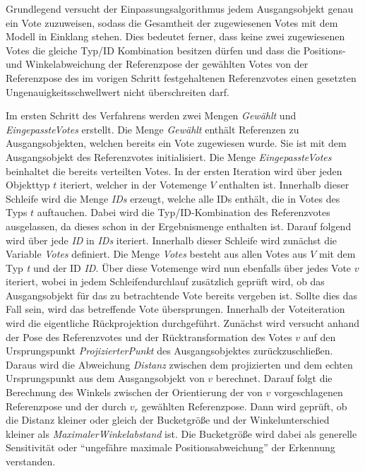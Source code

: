 Grundlegend versucht der Einpassungsalgorithmus jedem Ausgangsobjekt genau ein Vote zuzuweisen, sodass die Gesamtheit der zugewiesenen Votes mit dem Modell in Einklang stehen.
Dies bedeutet ferner, dass keine zwei zugewiesenen Votes die gleiche Typ/ID Kombination besitzen dürfen und dass die Positions- und Winkelabweichung der Referenzpose der gewählten Votes von der Referenzpose des im vorigen Schritt festgehaltenen Referenzvotes einen gesetzten Ungenauigkeitsschwellwert nicht überschreiten darf.

Im ersten Schritt des Verfahrens werden zwei Mengen \textit{Gewählt} und \textit{EingepassteVotes} erstellt.
Die Menge \textit{Gewählt} enthält Referenzen zu Ausgangsobjekten, welchen bereits ein Vote zugewiesen wurde. Sie ist mit dem Ausgangsobjekt des Referenzvotes initialisiert.
Die Menge \textit{EingepassteVotes} beinhaltet die bereits verteilten Votes.
In der ersten Iteration wird über jeden Objekttyp $t$ iteriert, welcher in der Votemenge $V$ enthalten ist.
Innerhalb dieser Schleife wird die Menge \textit{IDs} erzeugt, welche alle IDs enthält, die in Votes des Typs $t$ auftauchen.
Dabei wird die Typ/ID-Kombination des Referenzvotes ausgelassen, da dieses schon in der Ergebnismenge enthalten ist.
Darauf folgend wird über jede \textit{ID} in \textit{IDs} iteriert.
Innerhalb dieser Schleife wird zunächst die Variable \textit{Votes} definiert.
Die Menge \textit{Votes} besteht aus allen Votes aus $V$ mit dem Typ \textit{t} und der ID \textit{ID}.
Über diese Votemenge wird nun ebenfalls über jedes Vote $v$ iteriert, wobei in jedem Schleifendurchlauf zusätzlich geprüft wird, ob das Ausgangsobjekt für das zu betrachtende Vote bereits vergeben ist.
Sollte dies das Fall sein, wird das betreffende Vote übersprungen.
Innerhalb der Voteiteration wird die eigentliche Rückprojektion durchgeführt.
Zunächst wird versucht anhand der Pose des Referenzvotes und der Rücktransformation des Votes $v$ auf den Ursprungspunkt \textit{ProjizierterPunkt} des Ausgangsobjektes zurückzuschließen.
Daraus wird die Abweichung \textit{Distanz} zwischen dem projizierten und dem echten Ursprungspunkt aus dem Ausgangsobjekt von $v$ berechnet.
Darauf folgt die Berechnung des Winkels zwischen der Orientierung der von $v$ vorgeschlagenen Referenzpose und der durch $v_r$ gewählten Referenzpose.
Dann wird geprüft, ob die Distanz kleiner oder gleich der Bucketgröße und der Winkelunterschied kleiner als \textit{MaximalerWinkelabstand} ist.
Die Bucketgröße wird dabei als generelle Sensitivität oder "`ungefähre maximale Positionsabweichung"' der Erkennung verstanden.
